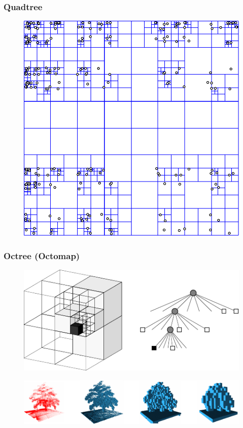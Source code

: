 \begin{frame}
    \frametitle{Quadtree}
    
    
    \begin{figure}
    	\includegraphics[width=0.5\columnwidth]{./images/quadtree.pdf}
    \end{figure}
    
\end{frame}


\begin{frame}
	\frametitle{Octree (Octomap)}

	\begin{figure}
		\includegraphics[width=0.5\columnwidth]{./images/octree.pdf}
	\end{figure}
	
	\begin{figure}
		\includegraphics[width=\columnwidth]{./images/octomap.pdf}
	\end{figure}
	
\end{frame}




